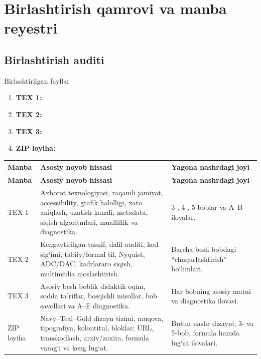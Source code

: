 \documentclass[11pt,a4paper,oneside]{book}
\begin{document}
\chapter{Birlashtirish qamrovi va manba reyestri}
\section{Birlashtirish auditi}

\begin{sourcebox}{Birlashtirilgan fayllar}
\begin{enumerate}[leftmargin=8mm,itemsep=1mm]
\item \textbf{TEX 1:} 
\item \textbf{TEX 2:} 
\item \textbf{TEX 3:} 
\item \textbf{ZIP loyiha:} 
\end{enumerate}
\end{sourcebox}

\begin{longtable}{L{0.16\textwidth}L{0.38\textwidth}L{0.36\textwidth}}
\toprule
\textbf{Manba} & \textbf{Asosiy noyob hissasi} & \textbf{Yagona nashrdagi joyi}\\
\midrule
\endfirsthead
\toprule
\textbf{Manba} & \textbf{Asosiy noyob hissasi} & \textbf{Yagona nashrdagi joyi}\\
\midrule
\endhead
TEX 1 & Axborot texnologiyasi, raqamli jamiyat, accessibility, grafik halolligi, xato aniqlash, uzatish kanali, metadata, siqish algoritmlari, mualliflik va diagnostika. & 3-, 4-, 5-boblar va A--B ilovalar.\\
TEX 2 & Kengaytirilgan tasnif, dalil auditi, kod sig‘imi, tabiiy/formal til, Nyquist, ADC/DAC, kadrlararo siqish, multimedia moslashtirish. & Barcha besh bobdagi “chuqurlashtirish” bo‘limlari.\\
TEX 3 & Asosiy besh boblik didaktik oqim, sodda ta’riflar, bosqichli misollar, bob savollari va A--E diagnostika. & Har bobning asosiy matni va diagnostika ilovasi.\\
ZIP loyiha & Navy--Teal--Gold dizayn tizimi, muqova, tipografiya, kolontitul, bloklar; URL, transkodlash, arxiv/zaxira, formula varag‘i va keng lug‘at. & Butun nashr dizayni, 3- va 5-bob, formula hamda lug‘at ilovalari.\\
\bottomrule
\end{longtable}
\end{document}
